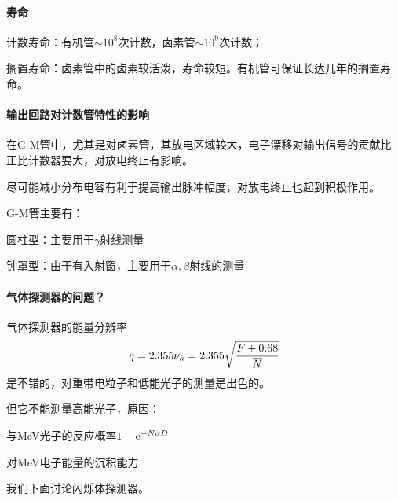 \paragraph{寿命}计数寿命：有机管$\sim 10^8$次计数，卤素管$\sim 10^9$次计数；

搁置寿命：卤素管中的卤素较活泼，寿命较短。有机管可保证长达几年的搁置寿命。
\paragraph{输出回路对计数管特性的影响}
在G-M管中，尤其是对卤素管，其放电区域较大，电子漂移对输出信号的贡献比正比计数器要大，对放电终止有影响。

尽可能减小分布电容有利于提高输出脉冲幅度，对放电终止也起到积极作用。


G-M管主要有：
\begin{compactenum}
	\item 圆柱型：主要用于$\gamma$射线测量
	\item 钟罩型：由于有入射窗，主要用于$\alpha,\beta$射线的测量
\end{compactenum}

\paragraph{气体探测器的问题？}气体探测器的能量分辨率
\[
	\eta=2.355\nu_h=2.355\sqrt{\frac{F+0.68}{\overline{N}}}
\]
是不错的，对重带电粒子和低能光子的测量是出色的。

但它不能测量高能光子，原因：
\begin{compactenum}
	\item 与MeV光子的反应概率$1-\mathop{}\!\mathrm{e}^{-N\sigma D}$
	\item 对MeV电子能量的沉积能力
\end{compactenum}
我们下面讨论闪烁体探测器。

